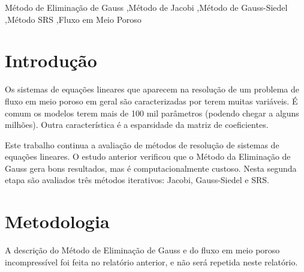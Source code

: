 \documentclass[final,5p]{elsarticle}
\numberwithin{equation}{section}
\begin{document}
\begin{frontmatter}
\begin{abstract}
\end{abstract}




\begin{keyword}
    Método de Eliminação de Gauss \sep Método de Jacobi \sep Método de Gauss-Siedel \sep Método SRS \sep Fluxo em Meio Poroso



\end{keyword}

\end{frontmatter}


\section{Introdução}

        Os sistemas de equações lineares que aparecem na resolução de um problema de fluxo em meio poroso em geral são caracterizadas por terem muitas variáveis. É comum os modelos terem mais de 100 mil parâmetros (podendo chegar a alguns milhões). Outra característica é a esparsidade da matriz de coeficientes.

        Este trabalho continua a avaliação de métodos de resolução de sistemas de equações lineares. O estudo anterior verificou que o Método da Eliminação de Gauss gera bons resultados, mas é computacionalmente custoso\cite{relatoriogauss}. Nesta segunda etapa são avaliados três métodos iterativos: Jacobi, Gauss-Siedel e SRS.

\section{Metodologia}

        A descrição do Método de Eliminação de Gauss e do fluxo em meio poroso incompressível foi feita no relatório anterior\cite{relatoriogauss}, e não será repetida neste relatório.
\end{document}
